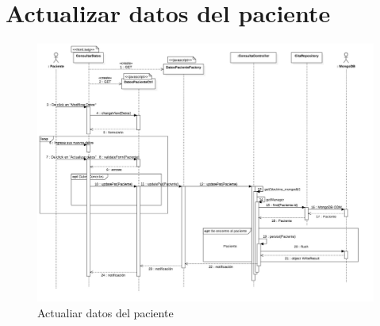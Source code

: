 
\section{Actualizar datos del paciente}
\begin{figure}[htbp!]
	\centering
	\includegraphics[width=1\textwidth]{uml/DiagramasSecuencia/AdrianGalindo/actualizarDatosPaciente}
	\caption{Actualiar datos del paciente}
\end{figure}

\newpage
